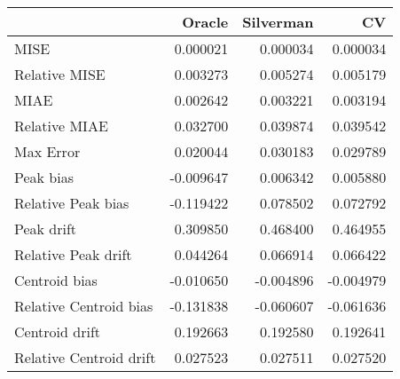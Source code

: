 \begin{tabular}{lrrr}
  \hline
 & Oracle & Silverman & CV \\ 
  \hline
MISE & 0.000021 & 0.000034 & 0.000034 \\ 
  Relative MISE & 0.003273 & 0.005274 & 0.005179 \\ 
  MIAE & 0.002642 & 0.003221 & 0.003194 \\ 
  Relative MIAE & 0.032700 & 0.039874 & 0.039542 \\ 
  Max Error & 0.020044 & 0.030183 & 0.029789 \\ 
  Peak bias & -0.009647 & 0.006342 & 0.005880 \\ 
  Relative Peak bias & -0.119422 & 0.078502 & 0.072792 \\ 
  Peak drift & 0.309850 & 0.468400 & 0.464955 \\ 
  Relative Peak drift & 0.044264 & 0.066914 & 0.066422 \\ 
  Centroid bias & -0.010650 & -0.004896 & -0.004979 \\ 
  Relative Centroid bias & -0.131838 & -0.060607 & -0.061636 \\ 
  Centroid drift & 0.192663 & 0.192580 & 0.192641 \\ 
  Relative Centroid drift & 0.027523 & 0.027511 & 0.027520 \\ 
   \hline
\end{tabular}
